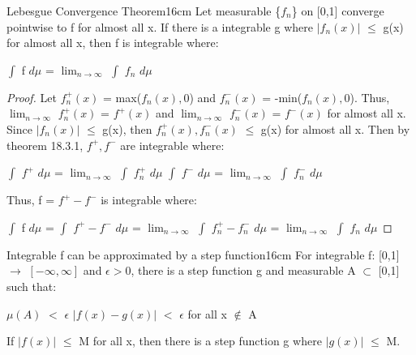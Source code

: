    \begin{wtheorem}{Lebesgue Convergence Theorem}{16cm}
        Let measurable \{$f_n$\} on [0,1] converge pointwise to f
        for almost all x. If there is a integrable g where
        $|f_n(x)|$ $\leq$ g(x) for almost all x, then f is integrable where:

        \hspace{0.5cm}
        $\int$ f $d\mu$ = $\lim_{n \rightarrow \infty}$ $\int$ $f_n$ $d\mu$
    \end{wtheorem}

    \begin{proof}
        Let $f_n^+(x)$ = max($f_n(x),0$) and $f_n^-(x)$ = -min($f_n(x),0$).
        Thus, $\lim_{n \rightarrow \infty}$ $f_n^+(x)$ = $f^+(x)$
        and $\lim_{n \rightarrow \infty}$ $f_n^-(x)$ = $f^-(x)$
        for almost all x.
        Since $|f_n(x)|$ $\leq$ g(x), then
        $f_n^+(x),f_n^-(x)$ $\leq$ g(x) for almost all x.
        Then by {\color{red} theorem 18.3.1}, $f^+,f^-$ are integrable where:

        \hspace{0.5cm}
        $\int$ $f^+$ $d\mu$
        = $\lim_{n \rightarrow \infty}$ $\int$ $f_n^+$ $d\mu$
        \hspace{1cm}
        $\int$ $f^-$ $d\mu$
        = $\lim_{n \rightarrow \infty}$ $\int$ $f_n^-$ $d\mu$

        Thus, f = $f^+ - f^-$ is integrable where:

        \hspace{0.5cm}
        $\int$ f $d\mu$
        = $\int$ $f^+ - f^-$ $d\mu$
        = $\lim_{n \rightarrow \infty}$ $\int$ $f_n^+ - f_n^-$ $d\mu$
        = $\lim_{n \rightarrow \infty}$ $\int$ $f_n$ $d\mu$
    \end{proof}

    \newpage



    \begin{wtheorem}{Integrable f can be approximated by a step function}{16cm}
        For integrable f: [0,1] $\rightarrow$ $[-\infty,\infty]$
        and $\epsilon > 0$, there is a step function g
        and measurable A $\subset$ [0,1] such that:
        
        \hspace{0.5cm}
        $\mu(A)$ $<$ $\epsilon$
        \hspace{1cm}
        $|f(x) - g(x)|$ $<$ $\epsilon$
        for all x $\not \in$ A

        If $|f(x)|$ $\leq$ M for all x, then
        there is a step function g where $|g(x)|$ $\leq$ M.
    \end{wtheorem}

